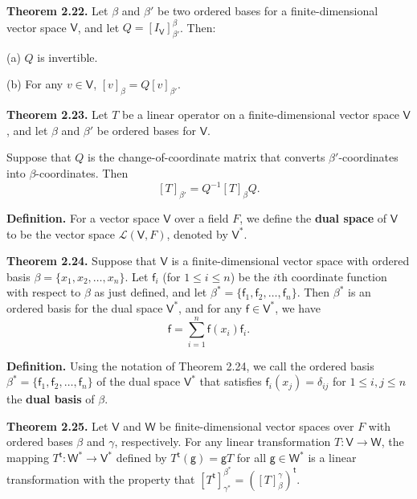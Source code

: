 \documentclass{article}
\newcommand{\0}{\mathit{0}}
\begin{document}
\medskip

\textbf{Theorem 2.22.} Let $\beta$ and $\beta'$ be two ordered bases for a finite-dimensional
vector space $\mathsf{V}$, and let $Q = \left[ I_{\mathsf{V}} \right]^\beta_{\beta'}$. Then:

(a) $Q$ is invertible.

(b) For any $v \in \mathsf{V}$,
\(
\left[ v \right]_\beta = Q \left[ v \right]_{\beta'}.
\)

\medskip

\textbf{Theorem 2.23.} Let $T$ be a linear operator on a finite-dimensional vector
space $\mathsf{V}$, and let $\beta$ and $\beta'$ be ordered bases for $\mathsf{V}$.

Suppose that $Q$ is the change-of-coordinate matrix that converts
$\beta'$-coordinates into $\beta$-coordinates. Then
\[
    \left[ T \right]_{\beta'} = Q^{-1} \left[ T \right]_{\beta} Q.
\]


\medskip

\textbf{Definition.} For a vector space $\mathsf{V}$ over a field $F$, we define the
\textbf{dual space} of $\mathsf{V}$ to be the vector space $\mathcal{L}(\mathsf{V}, F)$,
denoted by $\mathsf{V}^*$.

\medskip

\textbf{Theorem 2.24.} Suppose that $\mathsf{V}$ is a finite-dimensional vector space with
ordered basis $\beta = \{x_1, x_2, \dots, x_n\}$. Let $\mathsf{f}_i$ (for $1 \leq i \leq n$) be the
$i$th coordinate function with respect to $\beta$ as just defined, and let
$\beta^* = \{\mathsf{f}_1, \mathsf{f}_2, \dots, \mathsf{f}_n\}$.
Then $\beta^*$ is an ordered basis for the dual space $\mathsf{V}^*$, and for any
$\mathsf{f} \in \mathsf{V}^*$, we have
\[
    \mathsf{f} = \sum_{i=1}^{n} \mathsf{f}(x_i)\mathsf{f}_i.
\]

\medskip

\textbf{Definition.} Using the notation of Theorem 2.24, we call the ordered basis
$\beta^* = \{\mathsf{f}_1, \mathsf{f}_2, \dots, \mathsf{f}_n\}$ of the dual space $\mathsf{V}^*$ that satisfies
$\mathsf{f}_i(x_j) = \delta_{ij}$ for $1 \leq i, j \leq n$ the \textbf{dual basis} of $\beta$.

\medskip

\textbf{Theorem 2.25.} Let $\mathsf{V}$ and $\mathsf{W}$ be finite-dimensional vector spaces over
$F$ with ordered bases $\beta$ and $\gamma$, respectively. For any linear transformation
$T: \mathsf{V} \to \mathsf{W}$, the mapping
$T^{\mathsf{t}} : \mathsf{W}^* \to \mathsf{V}^*$
defined by $T^{\mathsf{t}}(\mathsf{g}) = \mathsf{g}T$ for all $\mathsf{g} \in \mathsf{W}^*$
is a linear transformation with the property that
\(
\left[ T^{\mathsf{t}} \right]^{\beta^*}_{\gamma^*} = \left( \left[ T \right]^\gamma_\beta \right)^{\mathsf{t}}.
\)
\end{document}
